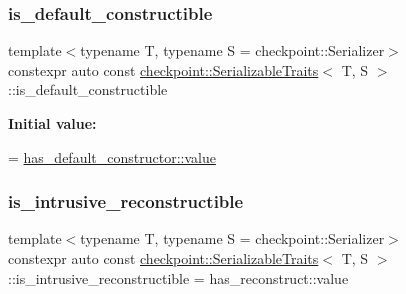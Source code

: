 \subsubsection{\texorpdfstring{is\+\_\+default\+\_\+constructible}{is\_default\_constructible}}
{\footnotesize\ttfamily template$<$typename T, typename S = checkpoint\+::\+Serializer$>$ \\
constexpr auto const \hyperlink{structcheckpoint_1_1_serializable_traits}{checkpoint\+::\+Serializable\+Traits}$<$ T, S $>$\+::is\+\_\+default\+\_\+constructible\hspace{0.3cm}{\ttfamily [static]}}

{\bfseries Initial value\+:}
\begin{DoxyCode}
=
    \hyperlink{structdetection_1_1detector_a6d7d0e1bdf5903db9edbe448edccf83b}{has\_default\_constructor::value}
\end{DoxyCode}
\mbox{\label{structcheckpoint_1_1_serializable_traits_a9879da69f4597dfb32b869142c1c46c9}} 
\subsubsection{\texorpdfstring{is\+\_\+intrusive\+\_\+reconstructible}{is\_intrusive\_reconstructible}}
{\footnotesize\ttfamily template$<$typename T, typename S = checkpoint\+::\+Serializer$>$ \\
constexpr auto const \hyperlink{structcheckpoint_1_1_serializable_traits}{checkpoint\+::\+Serializable\+Traits}$<$ T, S $>$\+::is\+\_\+intrusive\+\_\+reconstructible = has\+\_\+reconstruct\+::value\hspace{0.3cm}{\ttfamily [static]}}

\mbox{\label{structcheckpoint_1_1_serializable_traits_a35d5afbe97197885a1513765a210837c}} 
